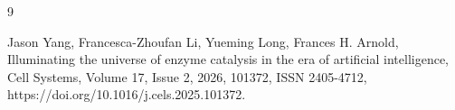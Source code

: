 \documentclass[runningheads]{llncs}
\begin{document}
\newpage
	 \begin{thebibliography}{9}
 
	     
	 	 
	 	 Jason Yang, Francesca-Zhoufan Li, Yueming Long, Frances H. Arnold,
	 	Illuminating the universe of enzyme catalysis in the era of artificial intelligence,
	 	Cell Systems,
	 	Volume 17, Issue 2,
	 	2026,
	 	101372,
	 	ISSN 2405-4712,
	 	https://doi.org/10.1016/j.cels.2025.101372.
	 	
	 \end{thebibliography}
 
\end{document}
